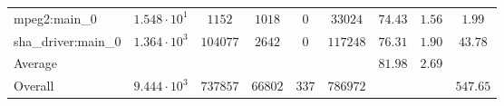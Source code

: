 \begin{tabular}{|l|c|c|c|c|c|c|c|c|}
mpeg2:main\_0           & $ 1.548 \cdot 10^{1} $ & $ 1152   $ & $ 1018  $ & $ 0   $ & $ 33024  $ & $ 74.43       $ & $ 1.56    $ & $ 1.99    $ \\
sha\_driver:main\_0     & $ 1.364 \cdot 10^{3} $ & $ 104077 $ & $ 2642  $ & $ 0   $ & $ 117248 $ & $ 76.31       $ & $ 1.90    $ & $ 43.78   $ \\
\hline
Average                 & $                    $ & $        $ & $       $ & $     $ & $        $ & $ 81.98       $ & $ 2.69    $ & $         $ \\
\hline
Overall                 & $ 9.444 \cdot 10^{3} $ & $ 737857 $ & $ 66802 $ & $ 337 $ & $ 786972 $ & $             $ & $         $ & $ 547.65  $ \\
\hline
\end{tabular}
